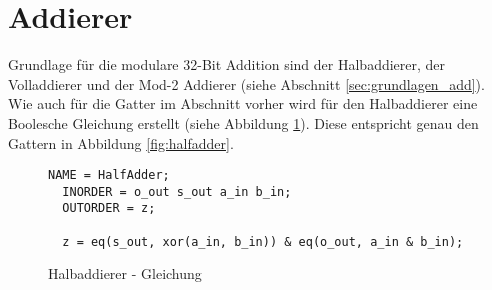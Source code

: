 \section{Addierer}
\label{sec:knf:addierer}

Grundlage für die modulare 32-Bit Addition sind der Halbaddierer, der Volladdierer und der Mod-2 Addierer (siehe Abschnitt \ref{sec:grundlagen_add}).
Wie auch für die Gatter im Abschnitt vorher wird für den Halbaddierer eine Boolesche Gleichung erstellt (siehe Abbildung \ref{fig:halfadder_eqn}).
Diese entspricht genau den Gattern in Abbildung \ref{fig:halfadder}.
\begin{figure}[!h]
  \centering
  \begin{lstlisting}[]
  NAME = HalfAdder;
  INORDER = o_out s_out a_in b_in;
  OUTORDER = z;

  z = eq(s_out, xor(a_in, b_in)) & eq(o_out, a_in & b_in);
  \end{lstlisting}
  \caption{Halbaddierer - Gleichung}
  \label{fig:halfadder_eqn}
\end{figure}

